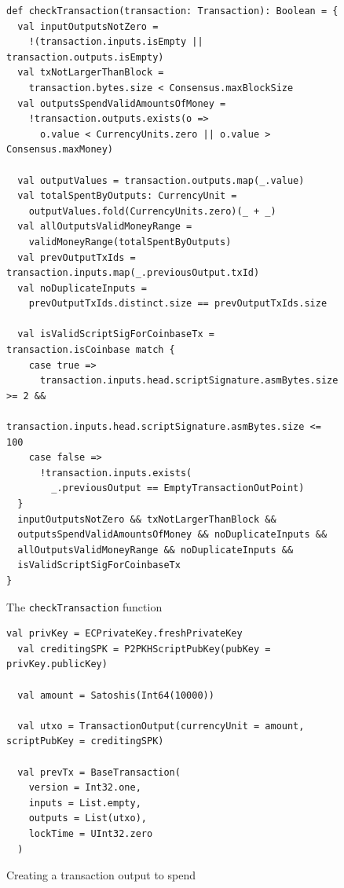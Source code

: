 \documentclass[hyphens, a4paper,USenglish,cleveref, autoref, thm-restate]{oasics-v2019}
\begin{document}
\begin{figure}
\begin{lstlisting}[style=scala]
def checkTransaction(transaction: Transaction): Boolean = {
  val inputOutputsNotZero =
    !(transaction.inputs.isEmpty || transaction.outputs.isEmpty)
  val txNotLargerThanBlock = 
    transaction.bytes.size < Consensus.maxBlockSize
  val outputsSpendValidAmountsOfMoney = 
    !transaction.outputs.exists(o =>
      o.value < CurrencyUnits.zero || o.value > Consensus.maxMoney)

  val outputValues = transaction.outputs.map(_.value)
  val totalSpentByOutputs: CurrencyUnit =
    outputValues.fold(CurrencyUnits.zero)(_ + _)
  val allOutputsValidMoneyRange = 
    validMoneyRange(totalSpentByOutputs)
  val prevOutputTxIds = transaction.inputs.map(_.previousOutput.txId)
  val noDuplicateInputs = 
    prevOutputTxIds.distinct.size == prevOutputTxIds.size

  val isValidScriptSigForCoinbaseTx = transaction.isCoinbase match {
    case true =>
      transaction.inputs.head.scriptSignature.asmBytes.size >= 2 &&
        transaction.inputs.head.scriptSignature.asmBytes.size <= 100
    case false =>
      !transaction.inputs.exists(
        _.previousOutput == EmptyTransactionOutPoint)
  }
  inputOutputsNotZero && txNotLargerThanBlock && 
  outputsSpendValidAmountsOfMoney && noDuplicateInputs &&
  allOutputsValidMoneyRange && noDuplicateInputs && 
  isValidScriptSigForCoinbaseTx
}
\end{lstlisting}
  
  \caption{The \texttt{checkTransaction} function}
  \label{fig:checktrans}
\end{figure}


\begin{figure}
\begin{lstlisting}[style=scala]
  val privKey = ECPrivateKey.freshPrivateKey
  val creditingSPK = P2PKHScriptPubKey(pubKey = privKey.publicKey)

  val amount = Satoshis(Int64(10000))

  val utxo = TransactionOutput(currencyUnit = amount, scriptPubKey = creditingSPK)

  val prevTx = BaseTransaction(
    version = Int32.one,
    inputs = List.empty,
    outputs = List(utxo),
    lockTime = UInt32.zero
  )
\end{lstlisting}
  
  \caption{Creating a transaction output to spend}
  \label{fig:prevtx}
\end{figure}
\end{document}
